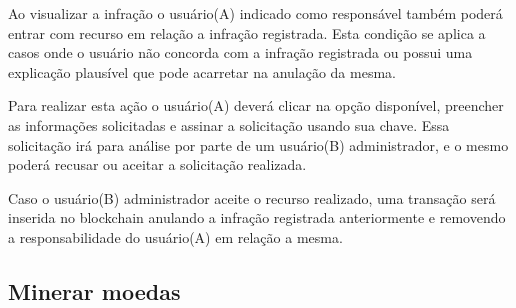         Ao visualizar a infração o usuário(A) indicado como responsável também poderá entrar com recurso em relação a infração registrada. Esta condição se aplica a casos onde o usuário não concorda com a infração registrada ou possui uma explicação plausível que pode acarretar na anulação da mesma.
        
        Para realizar esta ação o usuário(A) deverá clicar na opção disponível, preencher as informações solicitadas e assinar a solicitação usando sua chave. Essa solicitação irá para análise por parte de um usuário(B) administrador, e o mesmo poderá recusar ou aceitar a solicitação realizada.
        
        Caso o usuário(B) administrador aceite o recurso realizado, uma transação será inserida no blockchain anulando a infração registrada anteriormente e removendo a responsabilidade do usuário(A) em relação a mesma.
        
        
\subsection{Minerar moedas}


